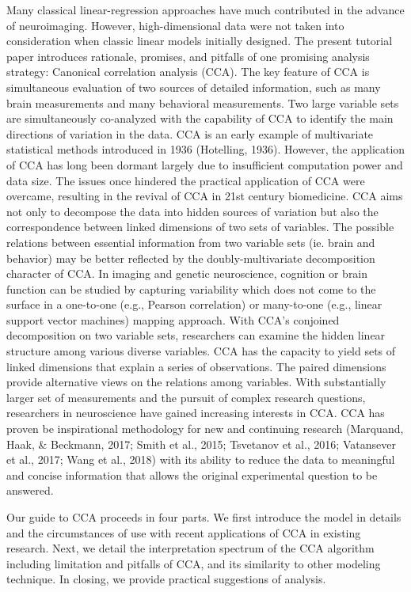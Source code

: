Many classical linear-regression approaches have much contributed in the advance of neuroimaging. However, high-dimensional data were not taken into consideration when classic linear models initially designed. The present tutorial paper introduces rationale, promises, and pitfalls of one promising analysis strategy: Canonical correlation analysis (CCA). The key feature of CCA is simultaneous evaluation of two sources of detailed information, such as many brain measurements and many behavioral measurements. Two large variable sets are simultaneously co-analyzed with the capability of CCA to identify the main directions of variation in the data. CCA is an early example of multivariate statistical methods introduced in 1936 (Hotelling, 1936). However, the application of CCA has long been dormant largely due to insufficient computation power and data size. The issues once hindered the practical application of CCA were overcame, resulting in the revival of CCA in 21st century biomedicine. CCA aims not only to decompose the data into hidden sources of variation but also the correspondence between linked dimensions of two sets of variables. The possible relations between essential information from two variable sets (ie. brain and behavior) may be better reflected by the doubly-multivariate decomposition character of CCA.  In imaging and genetic neuroscience, cognition or brain function can be studied by capturing variability which does not come to the surface in a one-to-one (e.g., Pearson correlation) or many-to-one (e.g., linear support vector machines) mapping approach. With CCA’s conjoined decomposition on two variable sets, researchers can examine the hidden linear structure among various diverse variables. CCA has the capacity to yield sets of linked dimensions that explain a series of observations. The paired dimensions provide alternative views on the relations among variables. With substantially larger set of measurements and the pursuit of complex research questions, researchers in neuroscience have gained increasing interests in CCA. CCA has proven be inspirational methodology for new and continuing research (Marquand, Haak, \& Beckmann, 2017; Smith et al., 2015; Tsvetanov et al., 2016; Vatansever et al., 2017; Wang et al., 2018) with its ability to reduce the data to meaningful and concise information that allows the original experimental question to be answered. 

Our guide to CCA proceeds in four parts. We first introduce the model in details and the circumstances of use with recent applications of CCA in existing research. Next, we detail the interpretation spectrum of the CCA algorithm including limitation and pitfalls of CCA, and its similarity to other modeling technique. In closing, we provide practical suggestions of analysis.

